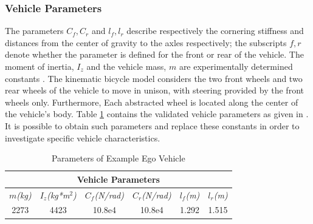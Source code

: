 \documentclass{easychair}
\theoremstyle{theorem}
\theoremstyle{remark}
\begin{document}

\subsubsection{Vehicle Parameters}
The parameters \(C_f,C_r\) and \(l_f, l_r\) describe respectively the cornering stiffness and distances from the center of gravity to the axles respectively; the subscripts $f,r$ denote whether the parameter is defined for the front or rear of the vehicle. The moment of inertia, \(I_z\) and the vehicle mass, \(m\) are experimentally determined constants \cite{Snider2009}. 
The kinematic bicycle model considers the two front wheels and two rear wheels of the vehicle to move in unison, with steering provided by the front wheels only. Furthermore, Each abstracted wheel is located along the center of the vehicle's body. Table \ref{table:vehiclep} contains the validated vehicle parameters as given in \cite{Althoff2014}. It is possible to obtain such parameters and replace these constants in order to investigate specific vehicle characteristics. 

\begin{table}[h]
	\centering
	\caption{Parameters of Example Ego Vehicle \cite{Althoff2014}}
	\label{table:vehiclep}
	\begin{tabular}{|c|c|c|c|c|c|}
		\hline
		\multicolumn{6}{|c|}{Vehicle Parameters} \\ \hline
		\textit{$m$(kg)} & \textit{$I_z$(kg*m$^2$)} & \textit{$C_f$(N/rad)} & \textit{$C_r$(N/rad)} & \textit{$l_f$(m)} & \textit{$l_r$(m)} \\ \hline
		2273 & 4423 & 10.8e4 & 10.8e4 & 1.292 & 1.515 \\ \hline
	\end{tabular}	
\end{table}
\end{document}
